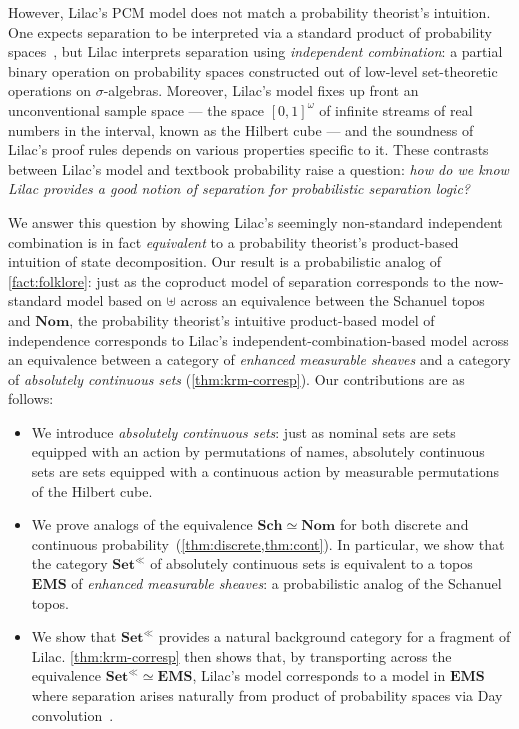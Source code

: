 \documentclass[
  sigconf,
  screen, ]{acmart}
\theoremstyle{definition}
\newcommand\nref[2]{\hyperref[#1]{#2}} \newcommand\checkhigh{{\huge{\color{red}\textbf{TODO: check}}}}
\newcommand\texagoodname{absolutely continuous set}
\newcommand\agoodname{\texagoodname}
\newcommand\agoodnamecat{\mathbf{Set}^\ll}
\newcommand\sheafcatadj{enhanced measurable}
\newcommand\texgoodsheaves{\sheafcatadj{} sheaves}
\newcommand\goodsheaves{\texgoodsheaves}
\newcommand\goodsheafcat{\mathbf{EMS}}
\newcommand\Sch{{\nref{def:Sch}{\mathbf{Sch}}}}
\newcommand\Nom{{\nref{def:Nom}{\mathbf{Nom}}}}
\newcommand\sheafcat{{\nref{def:sheafcat}{\goodsheafcat}}}
\newcommand\cgsets{{\nref{def:cgsets}{\agoodnamecat}}}
\begin{document}
However, Lilac's PCM model does not match a probability theorist's intuition.
One expects separation to be interpreted via a standard product
of probability spaces~\citep{kallenberg1997foundations}, but Lilac interprets separation
using \emph{independent combination}: a partial binary operation
on probability spaces constructed out of low-level set-theoretic
operations on $\sigma$-algebras.
Moreover, Lilac's model fixes up front an unconventional sample
space --- the space $[0,1]^\omega$
of infinite streams of real numbers in the interval, known as the Hilbert
cube --- and the soundness of Lilac's proof rules
depends on various properties specific to it.
These contrasts between Lilac's model and textbook probability
raise a question:
\emph{how do we know Lilac provides a good notion of separation for
probabilistic separation logic?}

We answer this question by showing Lilac's seemingly non-standard 
independent combination is in fact \emph{equivalent} to a probability theorist's 
product-based intuition of state decomposition.
Our result is a probabilistic analog of \cref{fact:folklore}:
just as the coproduct model of separation
corresponds to the now-standard model based on $\uplus$
across an equivalence between the Schanuel topos and $\Nom$,
the probability theorist's intuitive product-based model
of independence corresponds to Lilac's independent-combination-based model
across an equivalence between
a category of \emph{\goodsheaves}
and a category of \emph{\agoodname{s}} (\cref{thm:krm-corresp}).
Our contributions are as follows:
\begin{itemize}[leftmargin=*]
  \item 
    We introduce \emph{\agoodname{s}}:
    just as nominal sets are sets equipped with an action
    by permutations of names,
    \agoodname{s}
    are sets equipped with a continuous action 
    by measurable permutations
    of the Hilbert cube.
  \item
    We prove analogs of
    the equivalence $\Sch\simeq\Nom$
    for both discrete and continuous probability~(\cref{thm:discrete,thm:cont}).
    In particular, we show that
    the category $\cgsets$ of \agoodname{s}
    is equivalent to a topos $\sheafcat$ of \emph{\goodsheaves{}}:
    a probabilistic analog of the Schanuel topos.
  \item
    We show that $\cgsets$ provides a natural background category
    for a fragment of Lilac. 
    \cref{thm:krm-corresp} then shows that, by transporting across
    the equivalence $\cgsets\simeq\sheafcat$,
    Lilac's model corresponds
    to a 
    model
    in $\sheafcat$
    where separation
    arises naturally from product of probability spaces via Day convolution~\cite{dongol2016convolution,o1995syntactic,biering2004logic}.
\end{itemize}
\end{document}
